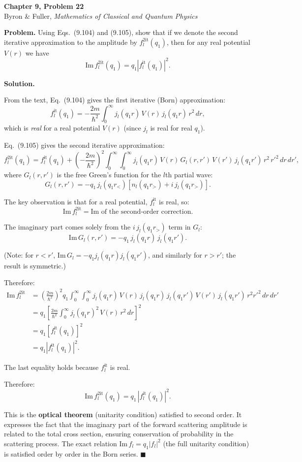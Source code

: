 \documentclass[12pt]{article}
\begin{document}
\begin{center}
{\Large\bfseries Chapter 9, Problem 22}\\[6pt]
Byron \& Fuller, \textit{Mathematics of Classical and Quantum Physics}
\end{center}

\bigskip

\textbf{Problem.} Using Eqs.~(9.104) and (9.105), show that if we denote the second iterative approximation to the amplitude by $f_l^{2\text{it}}(q_1)$, then for any real potential $V(r)$ we have
\[
\mathrm{Im}\,f_l^{2\text{it}}(q_1) = q_1|f_l^{\text{it}}(q_1)|^2.
\]

\bigskip
\textbf{Solution.}

From the text, Eq.~(9.104) gives the first iterative (Born) approximation:
\[
f_l^{\text{it}}(q_1) = -\frac{2m}{\hbar^2}\int_0^\infty j_l(q_1 r)\,V(r)\,j_l(q_1 r)\,r^2\,dr,
\]
which is \emph{real} for a real potential $V(r)$ (since $j_l$ is real for real $q_1$).

Eq.~(9.105) gives the second iterative approximation:
\[
f_l^{2\text{it}}(q_1) = f_l^{\text{it}}(q_1) + \left(-\frac{2m}{\hbar^2}\right)^2 \int_0^\infty\!\!\int_0^\infty j_l(q_1 r)\,V(r)\,G_l(r,r')\,V(r')\,j_l(q_1 r')\,r^2\,r'^2\,dr\,dr',
\]
where $G_l(r,r')$ is the free Green's function for the $l$th partial wave:
\[
G_l(r,r') = -q_1\,j_l(q_1 r_<)\left[n_l(q_1 r_>) + i\,j_l(q_1 r_>)\right].
\]

The key observation is that for a real potential, $f_l^{\text{it}}$ is real, so:
\[
\mathrm{Im}\,f_l^{2\text{it}} = \text{Im of the second-order correction}.
\]

The imaginary part comes solely from the $i\,j_l(q_1 r_>)$ term in $G_l$:
\[
\mathrm{Im}\,G_l(r,r') = -q_1\,j_l(q_1 r)\,j_l(q_1 r').
\]

(Note: for $r < r'$, $\text{Im}\,G_l = -q_1 j_l(q_1 r)j_l(q_1 r')$, and similarly for $r > r'$; the result is symmetric.)

Therefore:
\begin{align}
\mathrm{Im}\,f_l^{2\text{it}} &= \left(\frac{2m}{\hbar^2}\right)^2 q_1 \int_0^\infty\!\!\int_0^\infty j_l(q_1 r)\,V(r)\,j_l(q_1 r)\,j_l(q_1 r')\,V(r')\,j_l(q_1 r')\,r^2 r'^2\,dr\,dr' \\
&= q_1\left[\frac{2m}{\hbar^2}\int_0^\infty j_l(q_1 r)^2\,V(r)\,r^2\,dr\right]^2 \\
&= q_1\left[f_l^{\text{it}}(q_1)\right]^2 \\
&= q_1\left|f_l^{\text{it}}(q_1)\right|^2.
\end{align}

The last equality holds because $f_l^{\text{it}}$ is real.

Therefore:
\[
\boxed{\mathrm{Im}\,f_l^{2\text{it}}(q_1) = q_1\,|f_l^{\text{it}}(q_1)|^2}.
\]

This is the \textbf{optical theorem} (unitarity condition) satisfied to second order. It expresses the fact that the imaginary part of the forward scattering amplitude is related to the total cross section, ensuring conservation of probability in the scattering process. The exact relation $\mathrm{Im}\,f_l = q_1|f_l|^2$ (the full unitarity condition) is satisfied order by order in the Born series. \hfill $\blacksquare$
\end{document}
